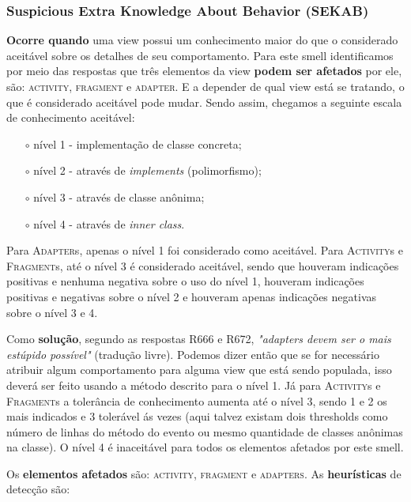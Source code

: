 \subsubsection{Suspicious Extra Knowledge About Behavior (SEKAB)}

\textbf{Ocorre quando} uma view possui um conhecimento maior do que o considerado aceit\'avel sobre os detalhes de seu comportamento. Para este smell identificamos por meio das respostas que tr\^es elementos da view \textbf{podem ser afetados} por ele, s\~ao: \textsc{activity}, \textsc{fragment} e \textsc{adapter}. E a depender de qual view est\'a se tratando, o que \'e considerado aceit\'avel pode mudar. Sendo assim, chegamos a seguinte escala de conhecimento aceit\'avel:

\begin{itemize} 
	\item[$\circ$] n\'ivel 1 - implementa\c{c}\~ao de classe concreta;
	\item[$\circ$] n\'ivel 2 - atrav\'es de \textit{implements} (polimorfismo);
	\item[$\circ$] n\'ivel 3 - atrav\'es de classe an\^onima;
	\item[$\circ$] n\'ivel 4 - atrav\'es de \textit{inner class}.
\end{itemize}

Para \textsc{Adapter}s, apenas o n\'ivel 1 foi considerado como aceit\'avel. Para \textsc{Activity}s e \textsc{Fragment}s, at\'e o n\'ivel 3 \'e considerado aceit\'avel, sendo que houveram indica\c{c}\~oes positivas e nenhuma negativa sobre o uso do n\'ivel 1, houveram indica\c{c}\~oes positivas e negativas sobre o n\'ivel 2 e houveram apenas indica\c{c}\~oes negativas sobre o n\'ivel 3 e 4. 

Como \textbf{solu\c{c}\~ao}, segundo as respostas R666 e R672, \textit{"adapters devem ser o mais est\'upido poss\'ivel"} (tradu\c{c}\~ao livre). Podemos dizer ent\~ao que se for necess\'ario atribuir algum comportamento para alguma view que est\'a sendo populada, isso dever\'a ser feito usando a m\'etodo descrito para o n\'ivel 1. J\'a para \textsc{Activity}s e \textsc{Fragment}s a toler\^ancia de conhecimento aumenta at\'e o n\'ivel 3, sendo 1 e 2 os mais indicados e 3 toler\'avel \'as vezes (aqui talvez existam dois thresholds como n\'umero de linhas do m\'etodo do evento ou mesmo quantidade de classes an\^onimas na classe). O n\'ivel 4 \'e inaceit\'avel para todos os elementos afetados por este smell.

Os \textbf{elementos afetados} s\~ao: \textsc{activity}, \textsc{fragment} e \textsc{adapters}. As \textbf{heur\'isticas} de detec\c{c}\~ao s\~ao:

